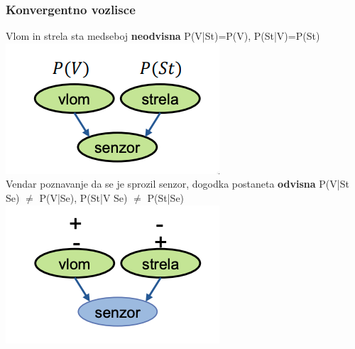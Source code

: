 \subsubsection{Konvergentno vozlisce}
Vlom in strela sta medseboj \textbf{neodvisna} P(V|St)=P(V), P(St|V)=P(St)\\
\includegraphics[width=\columnwidth]{images/bayes-konvergentno.png}\\
Vendar poznavanje da se je sprozil senzor, dogodka postaneta \textbf{odvisna}
P(V|St Se) $\neq$ P(V|Se), P(St|V Se) $\neq$ P(St|Se)\\
\includegraphics[width=\columnwidth]{images/bayes-konvergentno2.png}\\


